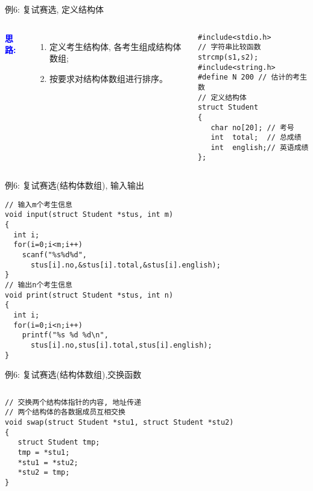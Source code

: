 \begin{frame}{例6: 复试赛选, 定义结构体}
\begin{columns}[T]
\textbf{\textcolor{blue}{思路:}}
\begin{enumerate}
	\item 定义考生结构体, 各考生组成结构体数组;
	\item 按要求对结构体数组进行排序。
\end{enumerate}
\begin{lstlisting}
#include<stdio.h>
// 字符串比较函数strcmp(s1,s2);
#include<string.h> 
#define N 200 // 估计的考生数
// 定义结构体
struct Student 
{ 
   char no[20]; // 考号
   int  total;  // 总成绩
   int  english;// 英语成绩
};
\end{lstlisting}
\end{columns}
\end{frame}

\begin{frame}{例6: 复试赛选(结构体数组), 输入输出}
\vspace{-0.4cm}
\begin{lstlisting}
// 输入m个考生信息
void input(struct Student *stus, int m)
{
  int i;
  for(i=0;i<m;i++) 
    scanf("%s%d%d",
      stus[i].no,&stus[i].total,&stus[i].english); 
}
// 输出n个考生信息
void print(struct Student *stus, int n)
{
  int i;
  for(i=0;i<n;i++) 
    printf("%s %d %d\n",
      stus[i].no,stus[i].total,stus[i].english); 
}
\end{lstlisting}
\end{frame}

\begin{frame}{例6: 复试赛选(结构体数组),交换函数}
\begin{columns}[T]
\begin{lstlisting}
// 交换两个结构体指针的内容, 地址传递
// 两个结构体的各数据成员互相交换 
void swap(struct Student *stu1, struct Student *stu2)
{
   struct Student tmp;
   tmp = *stu1; 
   *stu1 = *stu2;
   *stu2 = tmp;
}

\end{lstlisting}
\end{columns}
\medskip
\end{frame}

